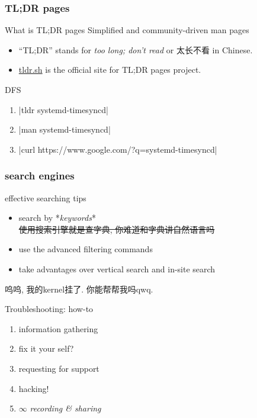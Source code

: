 \documentclass[8pt,t]{beamer}
\begin{document}
\begin{frame}
	\frametitle{TL;DR pages}
	\begin{block}{What is TL;DR pages}
		Simplified and community-driven man pages
		\begin{itemize}
			\item ``TL;DR'' stands for \emph{too long; don't read} or 太长不看 in Chinese.
			\item \href{https://tldr.sh/}{tldr.sh} is the official site for TL;DR pages project.
		\end{itemize}
	\end{block}


	\vfill
	\begin{examples}
		DFS
		\begin{enumerate}
			\item {}|tldr systemd-timesyncd|
			\item {}|man systemd-timesyncd|
			\item {}|curl https://www.google.com/?q=systemd-timesyncd|
		\end{enumerate}
	\end{examples}
\end{frame}

\begin{frame}
	\frametitle{search engines}
	\begin{block}{effective searching tips}
		\begin{itemize}
			\item search by *\emph{keywords}*\\
				\sout{使用搜索引擎就是查字典, 你难道和字典讲自然语言吗}
			\item use the advanced filtering commands
			\item take advantages over vertical search and in-site search
		\end{itemize}
	\end{block}

	\vfill

	\begin{examples}
		呜呜, 我的kernel挂了. 你能帮帮我吗qwq.
	\end{examples}

	\vfill

	\begin{block}{Troubleshooting: how-to}
		\begin{enumerate}
			\item information gathering
			\item fix it your self?
			\item requesting for support
			\item hacking!
			\item \(\infty\) \emph{recording \& sharing}
		\end{enumerate}
	\end{block}

\end{frame}
\end{document}
